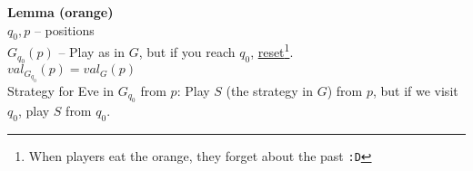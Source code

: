 \noindent
\textbf{Lemma (orange)}\\
$q_0, p$ -- positions\\
$G_{q_0}(p)$ -- Play as in $G$, but if you reach $q_0$, \underline{reset}\footnote{
    When players eat the orange, they forget about the past \texttt{:D}
}.\\
$val_{G_{q_0}}(p) = val_G(p)$\\
Strategy for Eve in $G_{q_0}$ from $p$: Play $S$ (the strategy in $G$) from $p$, but if we visit $q_0$, play
$S$ from $q_0$.